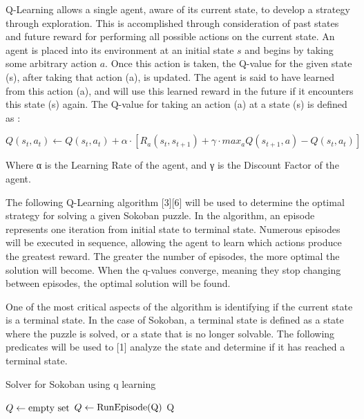 \documentclass[times, 10pt,twocolumn]{article}
\begin{document}
Q-Learning allows a single agent, aware of its current state, to develop a strategy through exploration. This is accomplished through consideration of past states and future reward for performing all possible actions on the current state. An agent is placed into its environment at an initial state $s$ and begins by taking some arbitrary action $a$. Once this action is taken, the Q-value for the given state (s), after taking that action (a), is updated. The agent is said to have learned from this action (a), and will use this learned reward in the future if it encounters this state (s) again. The Q-value for taking an action (a) at a state (s) is defined as \cite{ex1}:

$$Q(s_t, a_t) \gets Q(s_t, a_t) + \alpha \cdot [R_a(s_t, s_{t+1}) + \gamma \cdot max_aQ(s_{t+1}, a) - Q(s_t, a_t)]$$

Where α is the Learning Rate of the agent, and γ is the Discount Factor of the agent.



The following Q-Learning algorithm [3][6] will be used to determine the optimal strategy for solving a given Sokoban puzzle. In the algorithm, an episode represents one iteration from initial state to terminal state. Numerous episodes will be executed in sequence, allowing the agent to learn which actions produce the greatest reward. The greater the number of episodes, the more optimal the solution will become. When the q-values converge, meaning they stop changing between episodes, the optimal solution will be found.

One of the most critical aspects of the algorithm is identifying if the current state is a terminal state. In the case of Sokoban, a terminal state is defined as a state where the puzzle is solved, or a state that is no longer solvable. The following predicates will be used to [1] analyze the state and determine if it has reached a terminal state.

\begin{algorithm}
  \caption{Solver for Sokoban using q learning}
  \begin{algorithmic}[2]
      \State $Q\gets \textnormal{empty set}$
        \State $Q\gets \textnormal{RunEpisode(Q)}$
      \EndFor
      \Return Q
    \EndFunction
  \end{algorithmic}
\end{algorithm}
\end{document}
